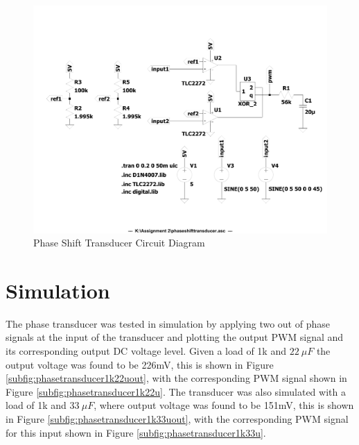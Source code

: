 \begin{figure}[h!]
    \centering
    \includegraphics[width = 0.65\linewidth]{Figures/phaseshifttransducer.pdf}
        \caption{Phase Shift Transducer Circuit Diagram}
    \label{fig:phaseshiftdetector.pdf}
\end{figure}

\section{Simulation} \label{sec:simulation_phasetransducer}
The phase transducer was tested in simulation by applying two out of phase signals at the input of the transducer and plotting the output PWM signal and its corresponding output DC voltage level. Given a load of 1k and $\SI{22}{\mu F}$ the output voltage was found to be 226mV, this is shown in Figure \ref{subfig:phasetransducer1k22uout}, with the corresponding PWM signal shown in Figure \ref{subfig:phasetransducer1k22u}. The transducer was also simulated with a load of 1k and $\SI{33}{\mu F}$, where output voltage was found to be 151mV, this is shown in Figure \ref{subfig:phasetransducer1k33uout}, with the corresponding PWM signal for this input shown in Figure \ref{subfig:phasetransducer1k33u}. 


